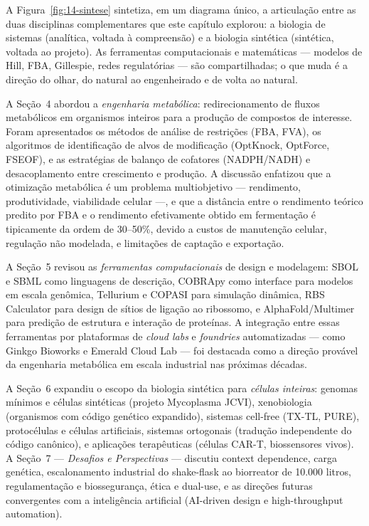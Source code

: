 A Figura~\ref{fig:14-sintese} sintetiza, em um diagrama único, a articulação entre as duas disciplinas complementares que este capítulo explorou: a biologia de sistemas (analítica, voltada à compreensão) e a biologia sintética (sintética, voltada ao projeto). As ferramentas computacionais e matemáticas --- modelos de Hill, FBA, Gillespie, redes regulatórias --- são compartilhadas; o que muda é a direção do olhar, do natural ao engenheirado e de volta ao natural.

A Seção~4 abordou a \emph{engenharia metabólica}: redirecionamento de fluxos metabólicos em organismos inteiros para a produção de compostos de interesse. Foram apresentados os métodos de análise de restrições (FBA, FVA), os algoritmos de identificação de alvos de modificação (OptKnock, OptForce, FSEOF), e as estratégias de balanço de cofatores (NADPH/NADH) e desacoplamento entre crescimento e produção. A discussão enfatizou que a otimização metabólica é um problema multiobjetivo --- rendimento, produtividade, viabilidade celular ---, e que a distância entre o rendimento teórico predito por FBA e o rendimento efetivamente obtido em fermentação é tipicamente da ordem de 30--50\%, devido a custos de manutenção celular, regulação não modelada, e limitações de captação e exportação.

A Seção~5 revisou as \emph{ferramentas computacionais} de design e modelagem: SBOL e SBML como linguagens de descrição, COBRApy como interface para modelos em escala genômica, Tellurium e COPASI para simulação dinâmica, RBS Calculator para design de sítios de ligação ao ribossomo, e AlphaFold/Multimer para predição de estrutura e interação de proteínas. A integração entre essas ferramentas por plataformas de \emph{cloud labs} e \emph{foundries} automatizadas --- como Ginkgo Bioworks e Emerald Cloud Lab --- foi destacada como a direção provável da engenharia metabólica em escala industrial nas próximas décadas.

A Seção~6 expandiu o escopo da biologia sintética para \emph{células inteiras}: genomas mínimos e células sintéticas (projeto Mycoplasma JCVI), xenobiologia (organismos com código genético expandido), sistemas cell-free (TX-TL, PURE), protocélulas e células artificiais, sistemas ortogonais (tradução independente do código canônico), e aplicações terapêuticas (células CAR-T, biossensores vivos). A Seção~7 --- \emph{Desafios e Perspectivas} --- discutiu context dependence, carga genética, escalonamento industrial do shake-flask ao biorreator de 10.000 litros, regulamentação e biossegurança, ética e dual-use, e as direções futuras convergentes com a inteligência artificial (AI-driven design e high-throughput automation).

